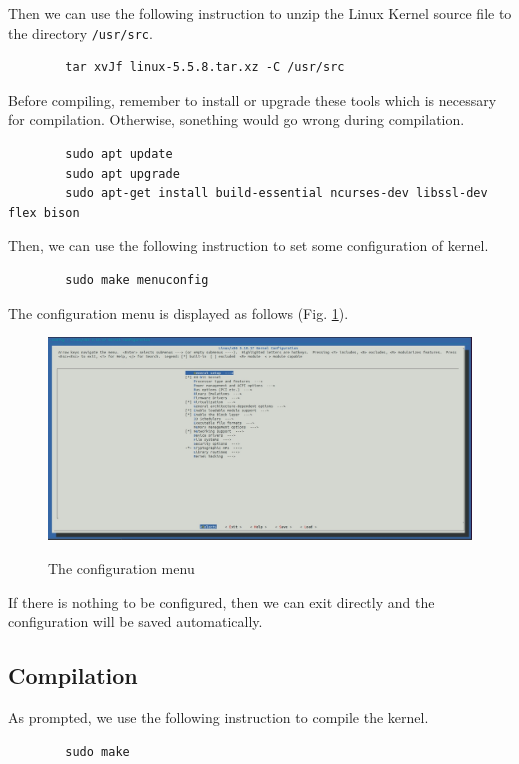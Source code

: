 \documentclass[a4paper, 12pt]{article}
\theoremstyle{definition}
\begin{document}
    Then we can use the following instruction to unzip the Linux Kernel source file to the directory \texttt{/usr/src}.

    \begin{lstlisting}
        tar xvJf linux-5.5.8.tar.xz -C /usr/src
    \end{lstlisting}
        
    Before compiling, remember to install or upgrade these tools which is necessary for compilation. Otherwise, sonething would go wrong during compilation.

    \begin{lstlisting}
        sudo apt update
        sudo apt upgrade
        sudo apt-get install build-essential ncurses-dev libssl-dev flex bison
    \end{lstlisting}

    Then, we can use the following instruction to set some configuration of kernel.

    \begin{lstlisting}
        sudo make menuconfig
    \end{lstlisting}

    The configuration menu is displayed as follows (Fig. \ref{fig3}).

    \begin{figure}[htbp]
        \centering
        \includegraphics[width=7in]{./pic/exe1/pic3.jpg}\\
        \caption{The configuration menu}\label{fig3}
    \end{figure}

    If there is nothing to be configured, then we can exit directly and the configuration will be saved automatically.

    \subsection{Compilation}
    
    As prompted, we use the following instruction to compile the kernel.

    \begin{lstlisting}
        sudo make
    \end{lstlisting}
\end{document}
